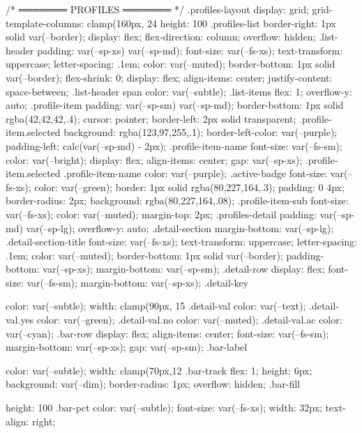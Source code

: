 {{/* ═══════ PROFILES ═══════ */
.profiles-layout {
  display: grid;
  grid-template-columns: clamp(160px, 24%
  height: 100%
}
.profiles-list { border-right: 1px solid var(--border); display: flex; flex-direction: column; overflow: hidden; }
.list-header {
  padding: var(--sp-xs) var(--sp-md); font-size: var(--fs-xs);
  text-transform: uppercase; letter-spacing: .1em; color: var(--muted);
  border-bottom: 1px solid var(--border); flex-shrink: 0;
  display: flex; align-items: center; justify-content: space-between;
}
.list-header span { color: var(--subtle); }
.list-items { flex: 1; overflow-y: auto; }
.profile-item { padding: var(--sp-sm) var(--sp-md); border-bottom: 1px solid rgba(42,42,42,.4); cursor: pointer; border-left: 2px solid transparent; }
.profile-item.selected { background: rgba(123,97,255,.1); border-left-color: var(--purple); padding-left: calc(var(--sp-md) - 2px); }
.profile-item-name { font-size: var(--fs-sm); color: var(--bright); display: flex; align-items: center; gap: var(--sp-xs); }
.profile-item.selected .profile-item-name { color: var(--purple); }
.active-badge { font-size: var(--fs-xs); color: var(--green); border: 1px solid rgba(80,227,164,.3); padding: 0 4px; border-radius: 2px; background: rgba(80,227,164,.08); }
.profile-item-sub { font-size: var(--fs-xs); color: var(--muted); margin-top: 2px; }
.profiles-detail { padding: var(--sp-md) var(--sp-lg); overflow-y: auto; }
.detail-section { margin-bottom: var(--sp-lg); }
.detail-section-title { font-size: var(--fs-xs); text-transform: uppercase; letter-spacing: .1em; color: var(--muted); border-bottom: 1px solid var(--border); padding-bottom: var(--sp-xs); margin-bottom: var(--sp-sm); }
.detail-row { display: flex; font-size: var(--fs-sm); margin-bottom: var(--sp-xs); }
.detail-key { color: var(--subtle); width: clamp(90px, 15%
.detail-val { color: var(--text); }
.detail-val.yes { color: var(--green); }
.detail-val.no  { color: var(--muted); }
.detail-val.ac  { color: var(--cyan); }
.bar-row { display: flex; align-items: center; font-size: var(--fs-sm); margin-bottom: var(--sp-xs); gap: var(--sp-sm); }
.bar-label { color: var(--subtle); width: clamp(70px,12%
.bar-track { flex: 1; height: 6px; background: var(--dim); border-radius: 1px; overflow: hidden; }
.bar-fill  { height: 100%
.bar-pct   { color: var(--subtle); font-size: var(--fs-xs); width: 32px; text-align: right; }

}}}}}
